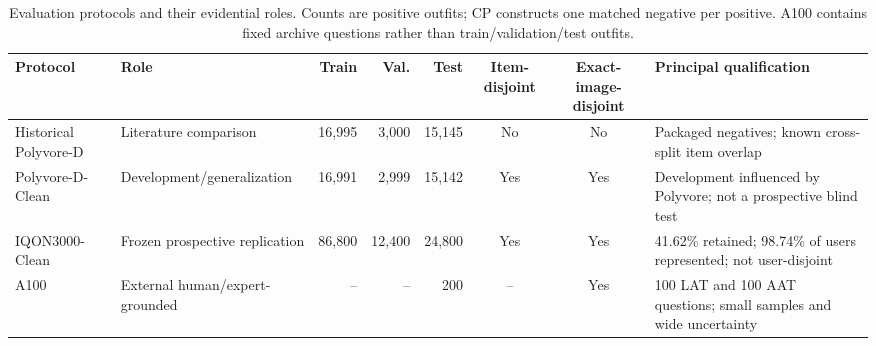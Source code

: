 \begin{table}[t]
\caption{Evaluation protocols and their evidential roles. Counts are positive outfits; CP constructs one matched negative per positive. A100 contains fixed archive questions rather than train/validation/test outfits.}
\label{tab:datasets}
\centering
\small
\begin{tabular}{l l r r r c c p{4.0cm}}
\toprule
Protocol & Role & Train & Val. & Test & Item-disjoint & Exact-image-disjoint & Principal qualification \\
\midrule
Historical Polyvore-D & Literature comparison & 16,995 & 3,000 & 15,145 & No & No & Packaged negatives; known cross-split item overlap \\
Polyvore-D-Clean & Development/generalization & 16,991 & 2,999 & 15,142 & Yes & Yes & Development influenced by Polyvore; not a prospective blind test \\
IQON3000-Clean & Frozen prospective replication & 86,800 & 12,400 & 24,800 & Yes & Yes & 41.62\% retained; 98.74\% of users represented; not user-disjoint \\
A100 & External human/expert-grounded & -- & -- & 200 & -- & Yes & 100 LAT and 100 AAT questions; small samples and wide uncertainty \\
\bottomrule
\end{tabular}
\end{table}
